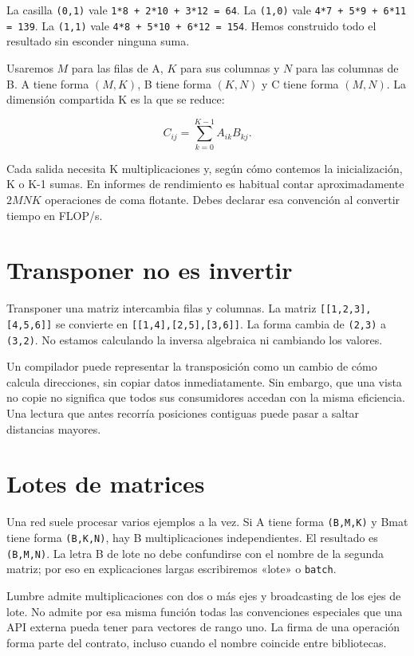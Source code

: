 \documentclass[12pt,a4paper,oneside]{report}
\begin{document}
La casilla \texttt{(0,1)} vale \texttt{1*8 + 2*10 +\allowbreak{} 3*12 = 64}. La \texttt{(1,0)} vale \texttt{4*7 + 5*9 + \allowbreak{}6*11 = 139}. La \texttt{(1,1)} vale \texttt{4*8 + 5*10 +\allowbreak{} 6*12 = 154}. Hemos construido todo el resultado sin esconder ninguna suma.

\begin{traduccion}
Usaremos $M$ para las filas de A, $K$ para sus columnas y $N$ para las columnas de B. A tiene forma $(M,K)$, B tiene forma $(K,N)$ y C tiene forma $(M,N)$. La dimensión compartida K es la que se reduce:

\[
C_{ij}=\sum_{k=0}^{K-1} A_{ik} B_{kj}.
\]
\end{traduccion}
Cada salida necesita K multiplicaciones y, según cómo contemos la inicialización, K o K-1 sumas. En informes de rendimiento es habitual contar aproximadamente $2MNK$ operaciones de coma flotante. Debes declarar esa convención al convertir tiempo en FLOP/s.

\section{Transponer no es invertir}
Transponer una matriz intercambia filas y columnas. La matriz \texttt{[[1,2,3],[4,5,6]]} se convierte en \texttt{[[1,4],[2,5],[3,6]]}. La forma cambia de \texttt{(2,3)} a \texttt{(3,2)}. No estamos calculando la inversa algebraica ni cambiando los valores.

Un compilador puede representar la transposición como un cambio de cómo calcula direcciones, sin copiar datos inmediatamente. Sin embargo, que una vista no copie no significa que todos sus consumidores accedan con la misma eficiencia. Una lectura que antes recorría posiciones contiguas puede pasar a saltar distancias mayores.

\section{Lotes de matrices}
Una red suele procesar varios ejemplos a la vez. Si A tiene forma \texttt{(B,M,K)} y Bmat tiene forma \texttt{(B,K,N)}, hay B multiplicaciones independientes. El resultado es \texttt{(B,M,N)}. La letra B de lote no debe confundirse con el nombre de la segunda matriz; por eso en explicaciones largas escribiremos «lote» o \texttt{batch}.

Lumbre admite multiplicaciones con dos o más ejes y broadcasting de los ejes de lote. No admite por esa misma función todas las convenciones especiales que una API externa pueda tener para vectores de rango uno. La firma de una operación forma parte del contrato, incluso cuando el nombre coincide entre bibliotecas.
\end{document}
